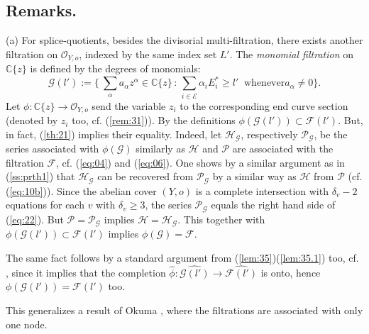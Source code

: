 \documentclass[10pt,a4paper]{amsart}
\numberwithin{equation}{section}
\numberwithin{equation}{subsection}
\theoremstyle{plain}
\theoremstyle{definition}
\begin{document}
\subsection{Remarks.} (a)
For splice-quotients, besides the divisorial multi-filtration,
there exists another filtration  on ${\mathcal{O}}_{Y,o}$, indexed by the
same index set $L'$. The {\em monomial filtration} on ${\mathbb{C}}\{z\}$
is defined  by the degrees of monomials:
\begin{equation}\label{eq:21}
{\mathcal{G}}(l'):=\big\{\ \sum_\alpha a_\alpha z^\alpha\in{\mathbb{C}}\{z\}\,:\,
\sum_{i\in{\mathcal{E}}}\alpha_iE_i^*\geq l'\ \mbox{ whenever
$a_\alpha\not=0$}\big\}.
\end{equation}
Let $\phi:{\mathbb{C}}\{z\}\to {\mathcal{O}}_{Y,o}$ send the variable $z_i$ to the
corresponding end curve section (denoted by $z_i$ too, cf.
(\ref{rem:31})). By the definitions  $\phi({\mathcal{G}}(l'))\subset
{\mathcal{F}}(l')$. But, in fact, (\ref{th:21}) implies their equality.
Indeed, let ${\mathcal{H}}_{\mathcal{G}}$, respectively ${\mathcal{P}}_{\mathcal{G}}$, be the series
associated with $\phi({\mathcal{G}})$ similarly as ${\mathcal{H}}$ and ${\mathcal{P}}$ are
associated with the filtration ${\mathcal{F}}$, cf. (\ref{eq:04}) and
(\ref{eq:06}). One shows by a similar argument as in
(\ref{ss:prth1}) that ${\mathcal{H}}_{\mathcal{G}}$ can be recovered from ${\mathcal{P}}_{\mathcal{G}}$ by
a similar way as ${\mathcal{H}}$ from ${\mathcal{P}}$ (cf. (\ref{eq:10b})). Since the
abelian cover $(Y,o)$ is a complete intersection with $\delta_v-2$
equations for each $v$ with $\delta_v\geq 3$, the series ${\mathcal{P}}_{\mathcal{G}}$
equals the right hand side of (\ref{eq:22}). But ${\mathcal{P}}={\mathcal{P}}_{\mathcal{G}}$
implies ${\mathcal{H}}={\mathcal{H}}_{\mathcal{G}}$. This together with $\phi({\mathcal{G}}(l'))\subset
{\mathcal{F}}(l')$ implies $\phi({\mathcal{G}})={\mathcal{F}}$.

The same fact follows by a standard argument from
(\ref{lem:35})(\ref{lem:35.1}) too, cf. \cite{Gabor}, since it
implies that the completion
$\widehat{\phi}:\widehat{{\mathcal{G}}(l')}\to\widehat{{\mathcal{F}}(l')}$ is onto,
hence  $\phi({\mathcal{G}}(l'))={\mathcal{F}}(l')$ too.

This generalizes a result of Okuma \cite[(3.3)]{Opg}, where the
filtrations  are associated with only one  node.
\end{document}
